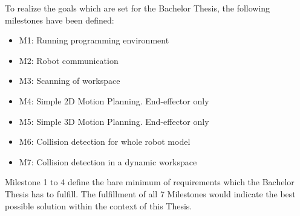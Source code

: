 To realize the goals which are set for the Bachelor Thesis, the following milestones have been defined:
\begin{itemize}
	\item M1: Running programming environment
	\item M2: Robot communication
	\item M3: Scanning of workspace
	\item M4: Simple 2D Motion Planning. End-effector only
	\item M5: Simple 3D Motion Planning. End-effector only
	\item M6: Collision detection for whole robot model
	\item M7: Collision detection in a dynamic workspace
\end{itemize}

Milestone 1 to 4 define the bare minimum of requirements which the Bachelor Thesis has to fulfill. The fulfillment of all 7 Milestones would indicate the best possible solution within the context of this Thesis. 

